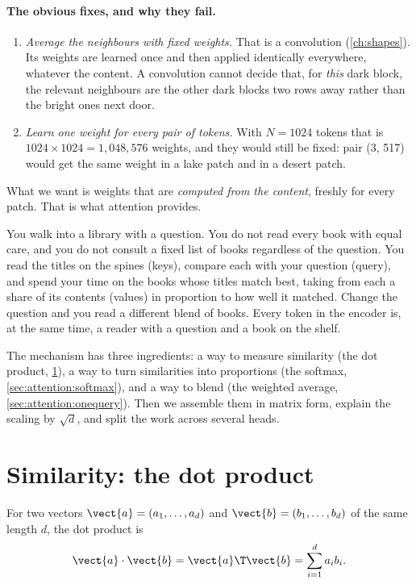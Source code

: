 \paragraph{The obvious fixes, and why they fail.}
\begin{enumerate}
  \item \emph{Average the neighbours with fixed weights.} That is a convolution
  (\cref{ch:shapes}). Its weights are learned once and then applied identically everywhere,
  whatever the content. A convolution cannot decide that, for \emph{this} dark block, the
  relevant neighbours are the other dark blocks two rows away rather than the bright ones next
  door.
  \item \emph{Learn one weight for every pair of tokens.} With $N = 1024$ tokens that is
  $1024 \times 1024 = 1{,}048{,}576$ weights, and they would still be fixed: pair (3, 517) would
  get the same weight in a lake patch and in a desert patch.
\end{enumerate}
What we want is weights that are \emph{computed from the content}, freshly for every patch. That
is what attention provides.

\begin{analogy}
You walk into a library with a question. You do not read every book with equal care, and you do
not consult a fixed list of books regardless of the question. You read the titles on the spines
(keys), compare each with your question (query), and spend your time on the books whose titles
match best, taking from each a share of its contents (values) in proportion to how well it
matched. Change the question and you read a different blend of books. Every token in the encoder
is, at the same time, a reader with a question and a book on the shelf.
\end{analogy}

The mechanism has three ingredients: a way to measure similarity (the dot product,
\cref{sec:attention:dot}), a way to turn similarities into proportions (the softmax,
\cref{sec:attention:softmax}), and a way to blend (the weighted average,
\cref{sec:attention:onequery}). Then we assemble them in matrix form, explain the scaling by
$\sqrt{d}$, and split the work across several heads.

\section{Similarity: the dot product}\label{sec:attention:dot}

\begin{definition}
For two vectors $\vect{a} = (a_1, \dots, a_d)$ and $\vect{b} = (b_1, \dots, b_d)$ of the same
length $d$, the dot product is
\begin{equation}\label{eq:attention:dot}
  \vect{a}\cdot\vect{b} = \vect{a}\T\vect{b} = \sum_{i=1}^{d} a_i b_i .
\end{equation}
\end{definition}

